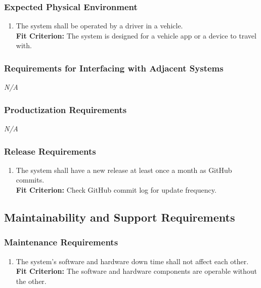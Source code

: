 \documentclass[12pt,letterpaper]{article}
\begin{document}
\subsubsection{Expected Physical Environment}
\begin{enumerate}[{OE}1.] 
    \item The system shall be operated by a driver in a vehicle. \label{pocnf4}
    \\
    \textbf{Fit Criterion:} The system is designed for a vehicle app or a device
    to travel with.
\end{enumerate}

\subsubsection{Requirements for Interfacing with Adjacent Systems}
\noindent \emph{N/A}

\subsubsection{Productization Requirements}
\noindent \emph{N/A}

\subsubsection{Release Requirements}
\begin{enumerate}[resume*] 
    \item The system shall have a new release at least once a month as GitHub
    commits.\\
    \textbf{Fit Criterion:} Check GitHub commit log for update frequency.
\end{enumerate}

\subsection{Maintainability and Support Requirements}
\subsubsection{Maintenance Requirements}
\begin{enumerate}[{MA}1.] 
    \item The system's software and hardware down time shall not affect each
    other.\\
    \textbf{Fit Criterion:} The software and hardware components are operable
    without the other.
\end{enumerate}
\end{document}
